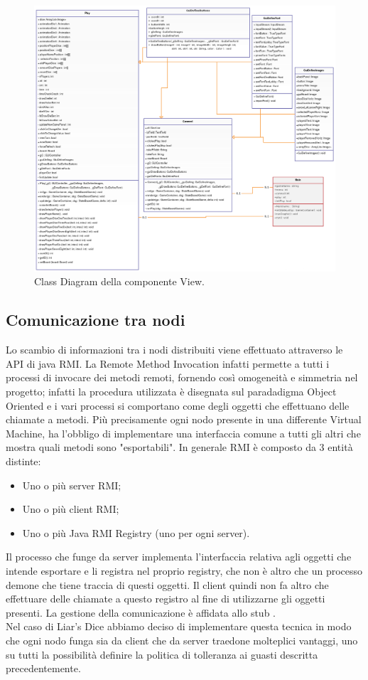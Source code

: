 \documentclass{llncs}
\begin{document}
		\newpage
		\begin{figure}[H]
			\includegraphics[scale=0.34]{img/View.png}
			\caption{\small{Class Diagram della componente View.}}
			\label{View}
		\end{figure}
		
		\subsection{Comunicazione tra nodi}
			Lo scambio di informazioni tra i nodi distribuiti viene effettuato attraverso le API di java RMI. La Remote Method Invocation infatti permette a tutti i processi di invocare dei metodi remoti, fornendo così omogeneità e simmetria nel progetto; infatti la procedura utilizzata è disegnata sul paradadigma Object Oriented e i vari processi si comportano come degli oggetti che effettuano delle chiamate a metodi.
			Più precisamente ogni nodo presente in una differente Virtual Machine, ha 
			l'obbligo di implementare una interfaccia comune a tutti gli altri che mostra quali metodi sono "esportabili". 
			In generale RMI è composto da 3 entità distinte: 
				\begin{itemize}
					\item Uno o più server RMI;
					\item Uno o più client RMI;
					\item Uno o più Java RMI Registry (uno per ogni server).
				\end{itemize}
			Il processo che funge da server implementa l'interfaccia relativa agli oggetti che intende esportare e li registra nel proprio registry, che non è altro che un processo demone che tiene traccia di questi oggetti. Il client quindi non fa altro che effettuare delle chiamate a questo registro al fine di utilizzarne gli oggetti presenti. La gestione della comunicazione è affidata allo stub \cite{rmi}. \\
			Nel caso di Liar's Dice abbiamo deciso di implementare questa tecnica in modo che ogni nodo funga sia da client che da server traedone molteplici vantaggi, uno su tutti la possibilità definire la politica di tolleranza ai guasti descritta precedentemente.
			
\end{document}
